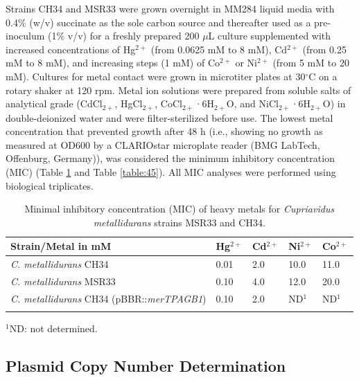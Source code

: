 Strains CH34 and MSR33 were grown overnight in MM284 liquid media with 0.4\% (w/v) succinate as the sole carbon source and thereafter used as a pre-inoculum (1\% v/v) for a freshly prepared 200 $\mu$L culture supplemented with increased concentrations of Hg$^{2+}$ (from 0.0625 mM to 8 mM), Cd$^{2+}$ (from 0.25 mM to 8 mM), and increasing steps (1 mM) of Co$^{2+}$ or Ni$^{2+}$ (from 5 mM to 20 mM). Cultures for metal contact were grown in microtiter plates at 30$^{\circ}$C on a rotary shaker at 120 rpm. Metal ion solutions were prepared from soluble salts of analytical grade (CdCl$_{2+}$, HgCl$_{2+}$, CoCl$_{2+}$·6H$_{2+}$O, and NiCl$_{2+}$·6H$_{2+}$O) in double-deionized water and were filter-sterilized before use. The lowest metal concentration that prevented growth after 48 h (i.e., showing no growth as measured at OD600 by a CLARIOstar microplate reader (BMG LabTech, Offenburg, Germany)), was considered the minimum inhibitory concentration (MIC) (Table \ref{table:41} and Table \ref{table:45}). All MIC analyses were performed using biological triplicates.

\begin{table}[ht]
\caption{Minimal inhibitory concentration (MIC) of heavy metals for \textit{Cupriavidus metallidurans} strains MSR33 and CH34. \\ }
\label{table:41}%
{%
\begin{tabular*}{\columnwidth}{@{}lllll@{}}
\hline
\textbf{Strain/Metal in mM} & \textbf{Hg$^{2+}$} & \textbf{Cd$^{2+}$} & \textbf{Ni$^{2+}$} & \textbf{Co$^{2+}$} \\
\hline
				
\textit{C. metallidurans }CH34 &	0.01 &	2.0 & 10.0 & 11.0 \\
\textit{C. metallidurans} MSR33 & 0.10 &	4.0 & 12.0 & 20.0 \\
\textit{C. metallidurans} CH34 (pBBR::\textit{merTPAGB1}) &	0.10 &	2.0	& ND$^1$ &	ND$^1$ \\
\\
\hline
\hline
\end{tabular*}
} {\footnotesize{$^1$ND: not determined.}}

\end{table}


\subsection{Plasmid Copy Number Determination}

